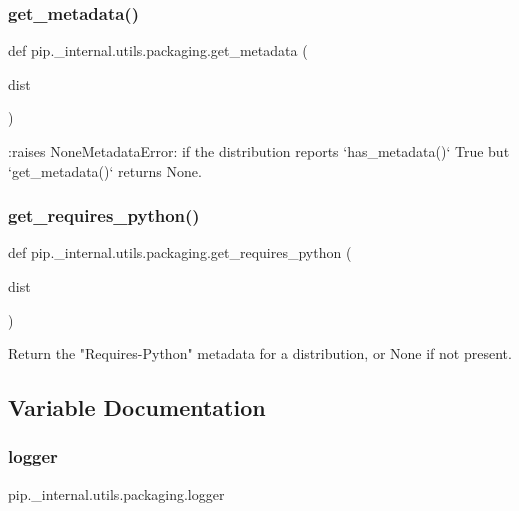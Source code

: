\subsubsection{\texorpdfstring{get\+\_\+metadata()}{get\_metadata()}}
{\footnotesize\ttfamily def pip.\+\_\+internal.\+utils.\+packaging.\+get\+\_\+metadata (\begin{DoxyParamCaption}\item[{}]{dist }\end{DoxyParamCaption})}

\begin{DoxyVerb}:raises NoneMetadataError: if the distribution reports `has_metadata()`
    True but `get_metadata()` returns None.
\end{DoxyVerb}
 \mbox{\label{namespacepip_1_1__internal_1_1utils_1_1packaging_a9a1a1b346a43ddd0501923f548359c86}} 
\subsubsection{\texorpdfstring{get\+\_\+requires\+\_\+python()}{get\_requires\_python()}}
{\footnotesize\ttfamily def pip.\+\_\+internal.\+utils.\+packaging.\+get\+\_\+requires\+\_\+python (\begin{DoxyParamCaption}\item[{}]{dist }\end{DoxyParamCaption})}

\begin{DoxyVerb}Return the "Requires-Python" metadata for a distribution, or None
if not present.
\end{DoxyVerb}
 

\subsection{Variable Documentation}
\mbox{\label{namespacepip_1_1__internal_1_1utils_1_1packaging_aeeaf45933f76591f1a386645f06bff17}} 
\subsubsection{\texorpdfstring{logger}{logger}}
{\footnotesize\ttfamily pip.\+\_\+internal.\+utils.\+packaging.\+logger}

